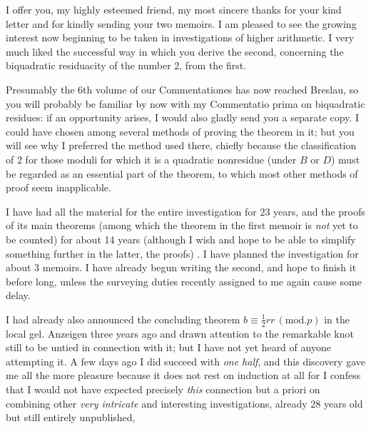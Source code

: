 \clearpage{}
I offer you, my highly esteemed friend, my most sincere thanks for your kind letter and for kindly sending your two memoirs. I am pleased to see the growing interest now beginning to be taken in investigations of higher arithmetic. I very much liked the successful way in which you derive the second, concerning the biquadratic residuacity of the number 2, from the first.
\par Presumably the 6th volume of our Commentationes has now reached Breslau, so you will probably be familiar by now with my Commentatio prima on biquadratic residues: if an opportunity arises, I would also gladly send you a separate copy. I could have chosen among several methods of proving the theorem in it; but you will see why I preferred the method used there, chiefly because the classification of 2 for those moduli for which it is a quadratic nonresidue (under $B$ or $D$) must be regarded as an essential part of the theorem, to which most other methods of proof seem inapplicable.
\par I have had all the material for the entire investigation for 23 years, and the proofs of its main theorems (among which the theorem in the first memoir is \textit{not} yet to be counted) for about 14 years \textemdash{} (although I wish and hope to be able to simplify something further in the latter, the proofs) \textemdash{}. I have planned the investigation for about 3 memoirs. I have already begun writing the second, and hope to finish it before long, unless the surveying duties recently assigned to me again cause some delay.
\par I had already also announced the concluding theorem $b\equiv\frac12rr\, (\mathrm{mod}.p)$ in the local gel. Anzeigen three years ago and drawn attention to the remarkable knot still to be untied in connection with it; but I have not yet heard of anyone attempting it. A few days ago I did succeed with \textit{one half}, and this discovery gave me all the more pleasure because it does not rest on induction at all \textemdash{} for I confess that I would not have expected precisely \textit{this} connection \textemdash{} but a priori on combining other \textit{very intricate} and interesting investigations, already 28 years old but still entirely unpublished,
